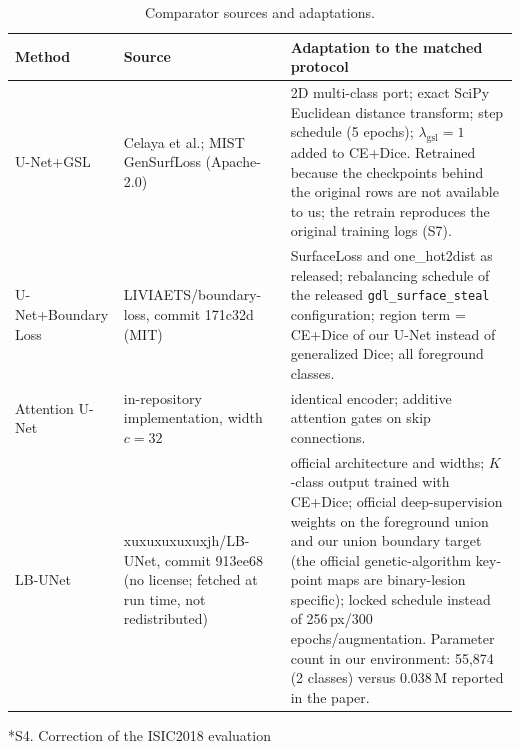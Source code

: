 \documentclass[10pt]{article}
\makeatletter
\renewcommand\section{\@startsection{section}{1}{\z@}{-2.4ex \@plus -1ex \@minus -.2ex}{1.2ex \@plus .2ex}{\normalfont\large\bfseries}}
\makeatother
\begin{document}
\begin{table}[!htbp]\centering\small
\begin{tabular}{p{2.6cm}p{4.5cm}p{8.2cm}}
\toprule
Method & Source & Adaptation to the matched protocol \\
\midrule
U-Net+GSL & Celaya et al.; MIST GenSurfLoss (Apache-2.0) & 2D multi-class port; exact SciPy Euclidean distance transform; step schedule (5 epochs); $\lambda_{\mathrm{gsl}}=1$ added to CE+Dice. Retrained because the checkpoints behind the original rows are not available to us; the retrain reproduces the original training logs (S7). \\
U-Net+Boundary Loss & LIVIAETS/boundary-loss, commit 171c32d (MIT) & SurfaceLoss and one\_hot2dist as released; rebalancing schedule of the released \texttt{gdl\_surface\_steal} configuration; region term = CE+Dice of our U-Net instead of generalized Dice; all foreground classes. \\
Attention U-Net & in-repository implementation, width $c=32$ & identical encoder; additive attention gates on skip connections. \\
LB-UNet & xuxuxuxuxuxjh/LB-UNet, commit 913ee68 (no license; fetched at run time, not redistributed) & official architecture and widths; $K$-class output trained with CE+Dice; official deep-supervision weights on the foreground union and our union boundary target (the official genetic-algorithm key-point maps are binary-lesion specific); locked schedule instead of 256\,px/300 epochs/augmentation. Parameter count in our environment: 55,874 (2 classes) versus 0.038\,M reported in the paper. \\
\bottomrule
\end{tabular}
\caption{Comparator sources and adaptations.}
\end{table}


\section*{S4. Correction of the ISIC2018 evaluation}
\end{document}
